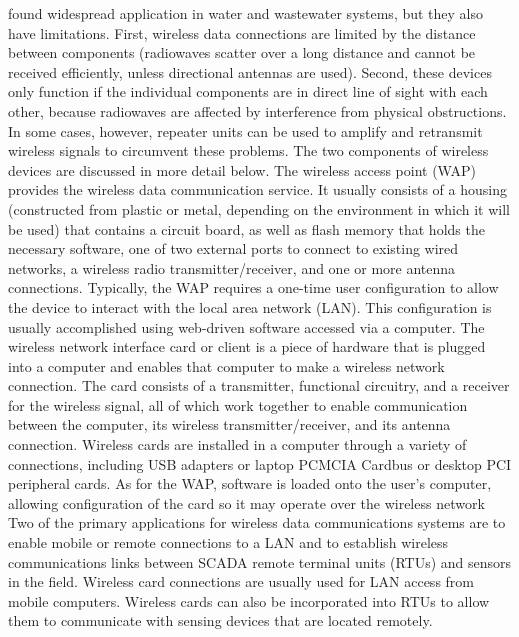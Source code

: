 \documentclass{article}
\begin{document}
found widespread application in water and wastewater systems, but they
also have limitations. First, wireless data connections are limited by
the distance between components (radiowaves scatter over a long distance
and cannot be received efficiently, unless directional antennas are
used). Second, these devices only function if the individual components
are in direct line of sight with each other, because radiowaves are
affected by interference from physical obstructions. In some cases,
however, repeater units can be used to amplify and retransmit wireless
signals to circumvent these problems. The two components of wireless
devices are discussed in more detail below. The wireless access point
(WAP) provides the wireless data communication service. It usually
consists of a housing (constructed from plastic or metal, depending on
the environment in which it will be used) that contains a circuit board,
as well as flash memory that holds the necessary software, one of two
external ports to connect to existing wired networks, a wireless radio
transmitter/receiver, and one or more antenna connections. Typically,
the WAP requires a one-time user configuration to allow the device to
interact with the local area network (LAN). This configuration is
usually accomplished using web-driven software accessed via a computer.
The wireless network interface card or client is a piece of hardware
that is plugged into a computer and enables that computer to make a
wireless network connection. The card consists of a transmitter,
functional circuitry, and a receiver for the wireless signal, all of
which work together to enable communication between the computer, its
wireless transmitter/receiver, and its antenna connection. Wireless
cards are installed in a computer through a variety of connections,
including USB adapters or laptop PCMCIA Cardbus or desktop PCI
peripheral cards. As for the WAP, software is loaded onto the user's
computer, allowing configuration of the card so it may operate over the
wireless network Two of the primary applications for wireless data
communications systems are to enable mobile or remote connections to a
LAN and to establish wireless communications links between SCADA remote
terminal units (RTUs) and sensors in the field. Wireless card
connections are usually used for LAN access from mobile computers.
Wireless cards can also be incorporated into RTUs to allow them to
communicate with sensing devices that are located remotely.
\end{document}
